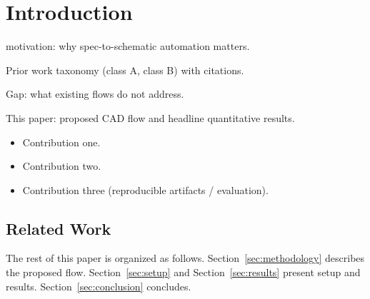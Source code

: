 \section{Introduction}
\label{sec:introduction}

 motivation: why spec-to-schematic automation matters.

Prior work taxonomy (class A, class B) with citations.

Gap: what existing flows do not address.

This paper: proposed CAD flow and headline quantitative results.

\begin{itemize}
    \item Contribution one.
    \item Contribution two.
    \item Contribution three (reproducible artifacts / evaluation).
\end{itemize}

\subsection{Related Work}
\label{sec:related}

The rest of this paper is organized as follows.
%
Section~\ref{sec:methodology} describes the proposed flow.
%
Section~\ref{sec:setup} and Section~\ref{sec:results} present setup and results.
%
Section~\ref{sec:conclusion} concludes.
